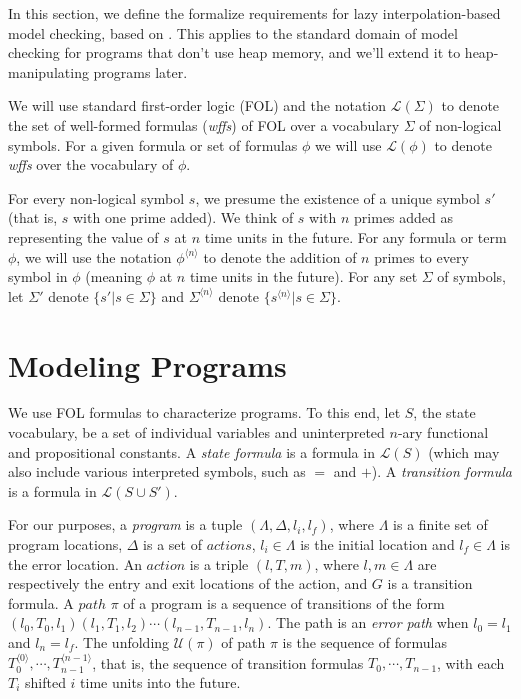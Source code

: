 \label{ch:background}

In this section, we define the formalize requirements for lazy interpolation-based model checking, based on \cite{mcmillan06}. This applies to the standard domain of model checking for programs that don't use heap memory, and we'll extend it to heap-manipulating programs later.

We will use standard first-order logic (FOL) and the notation $\mathcal{L}(\Sigma)$ to denote the set of well-formed formulas (\textit{wffs}) of FOL over a vocabulary $\Sigma$ of non-logical symbols. For a given formula or set of formulas $\phi$ we will use $\mathcal{L}(\phi)$ to denote \textit{wffs} over the vocabulary of $\phi$.

For every non-logical symbol $s$, we presume the existence of a unique symbol $s'$ (that is, $s$ with one prime added). We think of $s$ with $n$ primes added as representing the value of $s$ at $n$ time units in the future. For any formula or term $\phi$, we will use the notation $\phi^{\langle n \rangle}$ to denote the addition of $n$ primes to every symbol in $\phi$ (meaning $\phi$ at $n$ time units in the future). For any set $\Sigma$ of symbols, let $\Sigma'$ denote $\{ s' | s \in \Sigma \}$ and $\Sigma^{\langle n \rangle}$ denote $\{ s^{\langle n \rangle} | s \in \Sigma \}$.

\section{Modeling Programs}
\label{sec:modeling-programs}

We use FOL formulas to characterize programs. To this end, let $S$, the state vocabulary, be a set of individual variables and uninterpreted $n$-ary functional and propositional constants. A \textit{state formula} is a formula in $\mathcal{L}(S)$ (which may also include various interpreted symbols, such as $=$ and $+$). A \textit{transition formula} is a formula in $\mathcal{L}(S \cup S')$.

For our purposes, a \textit{program} is a tuple $(\Lambda, \Delta, l_i, l_f)$, where $\Lambda$ is a finite set of program locations, $\Delta$ is a set of $actions$, $l_i \in \Lambda$ is the initial location and $l_f \in \Lambda$ is the error location. An $action$ is a triple $(l, T, m)$, where $l,m \in \Lambda$ are respectively the entry and exit locations of the action, and $G$ is a transition formula. A $path$ $\pi$ of a program is a sequence of transitions of the form $(l_0, T_0, l_1)(l_1, T_1, l_2) \cdots (l_{n-1}, T_{n-1}, l_n)$. The path is an \textit{error path} when $l_0 = l_1$ and $l_n = l_f$. The unfolding $\mathcal{U}(\pi)$ of path $\pi$ is the sequence of formulas $T_0^{\langle 0 \rangle}, \cdots, T_{n-1}^{\langle n-1 \rangle}$, that is, the sequence of transition formulas $T_0, \cdots, T_{n-1}$, with each $T_i$ shifted $i$ time units into the future.

